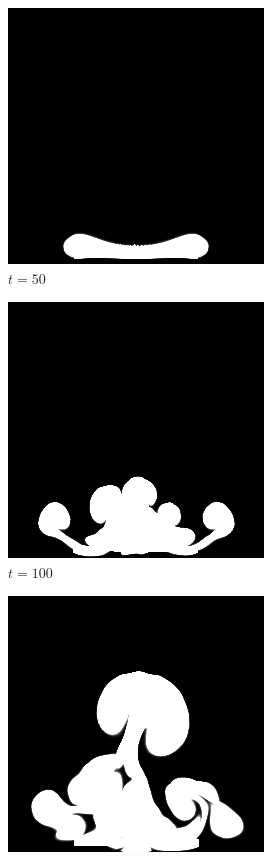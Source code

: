 \documentclass[a4paper,12pt,twoside]{report}
\begin{document}
\begin{figure}
	\centering
	\begin{subfigure}{0.18\textwidth}
		\centering
		\includegraphics[scale=0.28]{buoyancy_test/dens_000050_ref.png}
		\caption{$t=50$}
	\end{subfigure}
	\begin{subfigure}{0.18\textwidth}
		\centering
		\includegraphics[scale=0.28]{buoyancy_test/dens_000100_ref.png}
		\caption{$t=100$}
	\end{subfigure}
	\begin{subfigure}{0.18\textwidth}
		\centering
		\includegraphics[scale=0.28]{buoyancy_test/dens_000150_ref.png}

\end{subfigure}
\end{figure}
\end{document}
